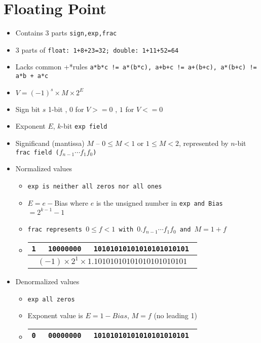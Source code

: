 \section{Floating Point}
\begin{itemize}[noitemsep, topsep=1pt]
    \item Contains $3$ parts \tt{sign,exp,frac}
    \item 3 parts of \tt{float}: 1+8+23=32; \tt{double}: 1+11+52=64
    \item Lacks common +*rules \tt{a*b*c != a*(b*c),} \tt{a+b+c != a+(b+c),} \tt{a*(b+c) != a*b + a*c}
    \item $V = (-1)^s \times M \times 2^E$
    \item Sign bit $s$ 1-bit , $0$ for $V>=0$ , $1$ for $V<=0$
    \item Exponent $E$, $k$-bit \tt{exp} field
    \item Significand (mantissa) $M$ -- $0\leq M<1$ or $1\leq M<2$, represented by $n$-bit \tt{frac} field ($f_{n - 1}\cdots f_1 f_0$)
    \item Normalized values
    \begin{itemize}[noitemsep, topsep=1pt]
        \item \tt{exp} is neither all zeros nor all ones
        \item $E = e - $Bias where $e$ is the unsigned number in \tt{exp} and Bias $= 2^{k - 1} - 1$
        \item \tt{frac} represents $0 \leq f < 1$ with $0.f_{n - 1}\cdots f_1 f_0$ and $M = 1 + f$
        \item 
            \begin{tabular}{|c|c|c|} \hline
            \tt{1} & \tt{10000000} & \tt{10101010101010101010101} \\ \hline
            \multicolumn{3}{|c|}{$(-1)\times 2^1\times 1.10101010101010101010101$}\\ \hline
            \end{tabular} 
    \end{itemize}
    \item Denormalized values
    \begin{itemize}[noitemsep, topsep=1pt]
        \item \tt{exp} all zeros
        \item Exponent value is $E = 1 - Bias$, $M = f$ (no leading 1)
        \item
            \begin{tabular}{|c|c|c|} \hline
            \tt{0} & \tt{00000000} & \tt{10101010101010101010101} \\ \hline

\end{tabular}
\end{itemize}
\end{itemize}
